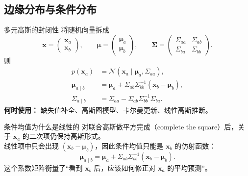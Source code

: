 \documentclass[11pt]{article}
\begin{document}
\subsection{边缘分布与条件分布}
\begin{formulabox}{多元高斯的封闭性}
将随机向量拆成
\[
\mathbf{x}=
\begin{pmatrix}
\mathbf{x}_a\\
\mathbf{x}_b
\end{pmatrix},\qquad
\boldsymbol{\mu}=
\begin{pmatrix}
\boldsymbol{\mu}_a\\
\boldsymbol{\mu}_b
\end{pmatrix},\qquad
\mathbf{\Sigma}=
\begin{pmatrix}
\Sigma_{aa} & \Sigma_{ab}\\
\Sigma_{ba} & \Sigma_{bb}
\end{pmatrix}.
\]
则
\begin{align}
p(\mathbf{x}_a)&=\mathcal N(\mathbf{x}_a\mid \boldsymbol{\mu}_a,\Sigma_{aa}),\\
\boldsymbol{\mu}_{a\mid b}
&= \boldsymbol{\mu}_a + \Sigma_{ab}\Sigma_{bb}^{-1}(\mathbf{x}_b-\boldsymbol{\mu}_b),\\
\Sigma_{a\mid b}
&= \Sigma_{aa}-\Sigma_{ab}\Sigma_{bb}^{-1}\Sigma_{ba}.
\end{align}
\textbf{何时使用：} 缺失值补全、高斯图模型、卡尔曼更新、线性高斯推断。
\end{formulabox}

\begin{derivationbox}{条件均值为什么是线性的}
对联合高斯做平方完成（complete the square）后，关于 $\mathbf{x}_a$ 的二次项仍保持高斯形式。\\
线性项中只会出现 $(\mathbf{x}_b-\boldsymbol{\mu}_b)$，因此条件均值只能是 $\mathbf{x}_b$ 的仿射函数：
\[
\boldsymbol{\mu}_{a\mid b}
= \boldsymbol{\mu}_a + \Sigma_{ab}\Sigma_{bb}^{-1}(\mathbf{x}_b-\boldsymbol{\mu}_b).
\]
这个系数矩阵衡量了“看到 $\mathbf{x}_b$ 后，应该如何修正对 $\mathbf{x}_a$ 的平均预测”。
\end{derivationbox}
\end{document}
